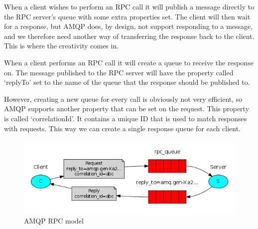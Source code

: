 When a client wishes to perform an RPC call it will publish a message directly to the RPC server's queue with some extra properties set. The client will then wait for a response, but AMQP does, by design, not support responding to a message, and we therefore need another way of transferring the response back to the client. This is where the creativity comes in.

When a client performs an RPC call it will create a queue to receive the response on. The message published to the RPC server will have the property called `replyTo' set to the name of the queue that the response should be published to.

However, creating a new queue for every call is obviously not very efficient, so AMQP supports another property that can be set on the request. This property is called `correlationId'. It contains a unique ID that is used to match responses with requests. This way we can create a single response queue for each client.

\begin{figure}[H]
  \includegraphics[width=\textwidth]{illustrations/amqp-rpc.png}
  \caption{AMQP RPC model\cite{AMQPRPC}}
\end{figure}

\label{subsubsec:AMQPRPC}
\newpage
